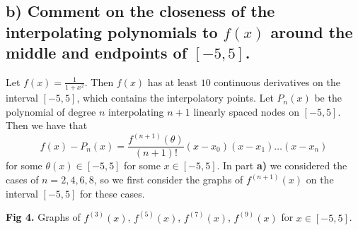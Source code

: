 \documentclass[11pt, letterpaper]{article}
\begin{document}
    \subsection*{b) \normalfont Comment on the closeness of the interpolating polynomials to $f(x)$ around
    the middle and endpoints of $[-5,5]$.}
    Let $f(x)=\frac{1}{1+x^2}$. Then $f(x)$ has at least $10$ continuous derivatives on the interval $[-5,5]$,
    which contains the interpolatory points. Let $P_n(x)$ be the polynomial of degree $n$ interpolating $n+1$ linearly
    spaced nodes on $[-5,5]$. Then we have that
    \[f(x)-P_n(x)=\frac{f^{(n+1)}(\theta)}{(n+1)!}(x-x_0)(x-x_1)\dots(x-x_n)\]
    for some $\theta(x)\in[-5,5]$ for some $x\in[-5,5]$. In part {\bf a)} we considered the cases of $n=2,4,6,8$, so 
    we first consider the graphs of $f^{(n+1)}(x)$ on the interval $[-5,5]$ for these cases.
    \begin{center}
    \end{center}
    {\bf Fig 4.} Graphs of $f^{(3)}(x)$, $f^{(5)}(x)$, $f^{(7)}(x)$, $f^{(9)}(x)$ for $x\in[-5,5]$.\\
\end{document}

